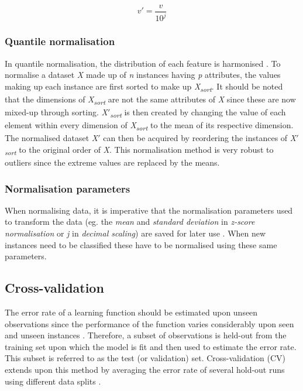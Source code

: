 \documentclass{article}[paper=a4,pagesize=auto,10pt]
\begin{document}
\begin{equation}\label{eq:decimal_scaling}
	v' = \frac{v}{10^j}
\end{equation}

\subsubsection{Quantile normalisation} \label{Quantile normalisation}

In quantile normalisation, the distribution of each feature is harmonised \cite{bolstad2003comparison}.  To normalise a dataset \textit{X} made up of \textit{n} instances having \textit{p} attributes, the values making up each instance are first sorted to make up \textit{X\textsubscript{sort}}. It should be noted that the dimensions of \textit{X\textsubscript{sort}} are not the same attributes of \textit{X} since these are now mixed-up through sorting. \textit{X}$'$\textit{\textsubscript{sort}} is then created by changing the value of each element within every dimension of \textit{X\textsubscript{sort}} to the mean of its respective dimension. The normalised dataset \textit{X}$'$ can then be acquired by reordering the instances of \textit{X}$'$\textit{\textsubscript{sort}} to the original order of \textit{X}.  This normalisation method is very robust to outliers since the extreme values are replaced by the means.

\subsubsection{Normalisation parameters} \label{Normalising parameters}

When normalising data, it is imperative that the normalisation parameters used to transform the data (eg. the \textit{mean} and \textit{standard deviation} in \textit{z-score normalisation} or \textit{j} in \textit{decimal scaling}) are saved for later use \cite{han2011data}. When new instances need to be classified these have to be normalised using these same parameters.

\subsection{Cross-validation} \label{Cross-validation}

The error rate of a learning function should be estimated upon unseen observations since the performance of the function varies considerably upon seen and unseen instances \cite{james2013introduction}. Therefore, a subset of observations is held-out from the training set upon which the model is fit and then used to estimate the error rate. This subset is referred to as the test (or validation) set. Cross-validation (CV) extends upon this method by averaging the error rate of several hold-out runs using different data splits \cite{arlot2010survey}.
\end{document}
